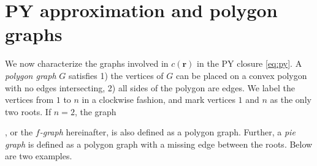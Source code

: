 \documentclass[aip,jcp,reprint,superscriptaddress]{revtex4-1}
\newcommand{\vct}[1]{\mathbf{#1}}
\providecommand{\vr}{} %
\renewcommand{\vr}{\vct{r}}
\begin{document}
\section{\label{sec:py}PY approximation and polygon graphs}





We now characterize the graphs involved in $c(\vr)$
  in the PY closure \eqref{eq:py}.
%
A \emph{polygon graph} $G$ satisfies
  1) the vertices of $G$ can be placed
  on a convex polygon
  with no edges intersecting,
  2) all sides of the polygon are edges.
%
We label the vertices from $1$ to $n$ in a clockwise fashion,
  and mark vertices $1$ and $n$ as the only two roots.
%
If $n = 2$, the graph
  ,
  or the \emph{$f$-graph} hereinafter,
  is also defined as a polygon graph.
%
Further,
  a \emph{pie graph}
  is defined as
  a polygon graph with a missing edge between the roots.
%
Below are two examples.
%
\end{document}
